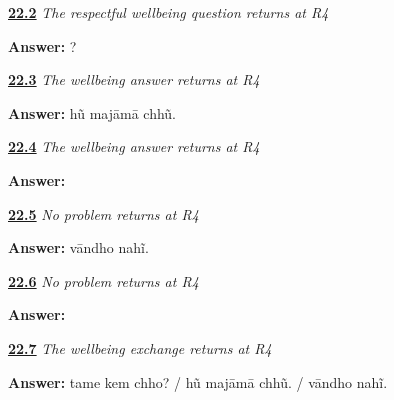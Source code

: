 \noindent\begin{minipage}[t]{\linewidth}
\raggedright
\hyperlink{review-GU-R18-how-are-you-r4-writing}{\textbf{22.2}} \emph{The respectful wellbeing question returns at R4}\par
\small \textbf{Answer:}   ?\par
\end{minipage}\par\medskip

\noindent\begin{minipage}[t]{\linewidth}
\raggedright
\hyperlink{review-GU-R18-majaa-r4-listening}{\textbf{22.3}} \emph{The wellbeing answer returns at R4}\par
\small \textbf{Answer:} hũ majāmā chhũ.\par
\end{minipage}\par\medskip

\noindent\begin{minipage}[t]{\linewidth}
\raggedright
\hyperlink{review-GU-R18-majaa-r4-writing}{\textbf{22.4}} \emph{The wellbeing answer returns at R4}\par
\small \textbf{Answer:}   \par
\end{minipage}\par\medskip

\noindent\begin{minipage}[t]{\linewidth}
\raggedright
\hyperlink{review-GU-R18-no-problem-r4-listening}{\textbf{22.5}} \emph{No problem returns at R4}\par
\small \textbf{Answer:} vāndho nahĩ.\par
\end{minipage}\par\medskip

\noindent\begin{minipage}[t]{\linewidth}
\raggedright
\hyperlink{review-GU-R18-no-problem-r4-writing}{\textbf{22.6}} \emph{No problem returns at R4}\par
\small \textbf{Answer:}  \par
\end{minipage}\par\medskip

\noindent\begin{minipage}[t]{\linewidth}
\raggedright
\hyperlink{review-GU-R18-wellbeing-r4-listening}{\textbf{22.7}} \emph{The wellbeing exchange returns at R4}\par
\small \textbf{Answer:} tame kem chho? / hũ majāmā chhũ. / vāndho nahĩ.\par
\end{minipage}\par\medskip


